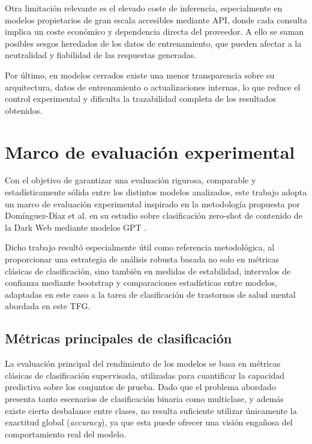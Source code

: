 Otra limitación relevante es el elevado coste de inferencia, especialmente en modelos propietarios de gran escala accesibles mediante \ac{API}, donde cada consulta implica un coste económico y dependencia directa del proveedor. A ello se suman posibles sesgos heredados de los datos de entrenamiento, que pueden afectar a la neutralidad y fiabilidad de las respuestas generadas.

Por último, en modelos cerrados existe una menor transparencia sobre su arquitectura, datos de entrenamiento o actualizaciones internas, lo que reduce el control experimental y dificulta la trazabilidad completa de los resultados obtenidos.

\section{Marco de evaluación experimental}

Con el objetivo de garantizar una evaluación rigurosa, comparable y estadísticamente sólida entre los distintos modelos analizados, este trabajo adopta un marco de evaluación experimental inspirado en la metodología propuesta por Domínguez-Díaz et al. en su estudio sobre clasificación zero-shot de contenido de la Dark Web mediante modelos GPT \cite{dominguez-diaz_classifying_2026}.

Dicho trabajo resultó especialmente útil como referencia metodológica, al proporcionar una estrategia de análisis robusta basada no solo en métricas clásicas de clasificación, sino también en medidas de estabilidad, intervalos de confianza mediante bootstrap y comparaciones estadísticas entre modelos, adaptadas en este caso a la tarea de clasificación de trastornos de salud mental abordada en este TFG.

\subsection{Métricas principales de clasificación}

La evaluación principal del rendimiento de los modelos se basa en métricas clásicas de clasificación supervisada, utilizadas para cuantificar la capacidad predictiva sobre los conjuntos de prueba. Dado que el problema abordado presenta tanto escenarios de clasificación binaria como multiclase, y además existe cierto desbalance entre clases, no resulta suficiente utilizar únicamente la exactitud global (\textit{accuracy}), ya que esta puede ofrecer una visión engañosa del comportamiento real del modelo.


